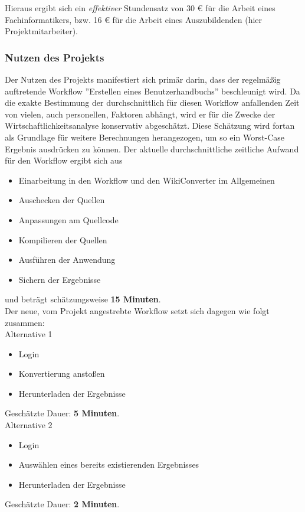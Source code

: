\documentclass[12pt, xcolor=dvipsnames]{scrartcl}
\begin{document}
Hieraus ergibt sich ein \textit{effektiver} Stundensatz von 30 \euro{} für die Arbeit eines Fachinformatikers, bzw. 16 \euro{} für die Arbeit eines Auszubildenden (hier Projektmitarbeiter).


\subsubsection{Nutzen des Projekts}
\label{sec:nutzen_des_projekts}

Der Nutzen des Projekts manifestiert sich primär darin, dass der regelmäßig auftretende Workflow ''Erstellen eines Benutzerhandbuchs'' beschleunigt wird.
Da die exakte Bestimmung der durchschnittlich für diesen Workflow anfallenden Zeit von vielen, auch personellen, Faktoren abhängt, wird er für die Zwecke der Wirtschaftlichkeitsanalyse konservativ abgeschätzt. Diese Schätzung wird fortan als Grundlage für weitere Berechnungen herangezogen, um so ein Worst-Case Ergebnis ausdrücken zu können.
Der aktuelle durchschnittliche zeitliche Aufwand für den Workflow ergibt sich aus
\begin{itemize}
	\item Einarbeitung in den Workflow und den WikiConverter im Allgemeinen
	\item Auschecken der Quellen
	\item Anpassungen am Quellcode
	\item Kompilieren der Quellen
	\item Ausführen der Anwendung
	\item Sichern der Ergebnisse
\end{itemize}
und beträgt schätzungsweise \textbf{15 Minuten}. \\

Der neue, vom Projekt angestrebte Workflow setzt sich dagegen wie folgt zusammen: \\

Alternative 1
\begin{itemize}
	\item Login
	\item Konvertierung anstoßen
	\item Herunterladen der Ergebnisse
\end{itemize}
Geschätzte Dauer: \textbf{5 Minuten}. \\

Alternative 2
\begin{itemize}
	\item Login
	\item Auswählen eines bereits existierenden Ergebnisses
	\item Herunterladen der Ergebnisse
\end{itemize}
Geschätzte Dauer: \textbf{2 Minuten}. \\
\end{document}
